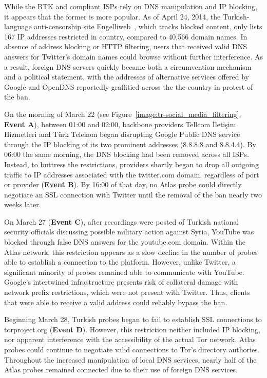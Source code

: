 While the BTK and compliant ISPs rely on DNS manipulation and IP
blocking, it appears that the former is more popular.  As of April 24,
2014, the Turkish-language anti-censorship site Engelliweb~\cite{Engelliweb},
which tracks blocked content, only lists 167 IP addresses restricted in
country, compared to 40,566 domain names. In absence
of address blocking or HTTP filtering, users that received valid DNS
answers for Twitter's domain names could browse without further
interference. As a result, foreign DNS servers quickly became both a
circumvention mechanism and a political statement, with the addresses of
alternative services offered by Google and OpenDNS reportedly graffitied
across the the country in protest of the ban.

On the morning of March 22 (see
Figure~\ref{image:tr-social_media_filtering}, \textbf{Event A}), between
01:00 and 02:00, backbone providers Tellcom \.{I}leti\c{s}im Hizmetleri
and T\"{u}rk Telekom began disrupting Google Public DNS service through
the IP blocking of its two prominent addresses (8.8.8.8 and 8.8.4.4). By
06:00 the same morning, the DNS blocking had been removed across all
ISPs. Instead, to buttress the restrictions, providers shortly began to
drop all outgoing traffic to IP addresses associated with the twitter.com
domain, regardless of port or provider (\textbf{Event B}). By 16:00 of
that day, no Atlas probe could directly negotiate an SSL connection with
Twitter until the removal of the ban nearly two weeks later.

On March 27 (\textbf{Event C}), after recordings were posted of Turkish
national security officials discussing possible military action against
Syria, YouTube was blocked through false DNS answers for the youtube.com
domain. Within the Atlas network, this restriction appears as a slow
decline in the number of probes able to establish a connection to the
platform. However, unlike Twitter, a significant minority of probes
remained able to communicate with YouTube. Google's intertwined
infrastructure presents risk of collateral damage with network prefix
restrictions, which were not present with Twitter. Thus, clients that
were able to receive a valid address could reliably bypass the ban.

Beginning March 28, Turkish probes began to fail to establish SSL
connections to torproject.org (\textbf{Event D}). However, this
restriction neither included IP blocking, nor apparent interference with
the accessibility of the actual Tor network. Atlas probes could continue
to negotiate valid connections to Tor's directory authories. Throughout
the increased manipulation of local DNS services, nearly half of the
Atlas probes remained connected due to their use of foreign DNS services.

